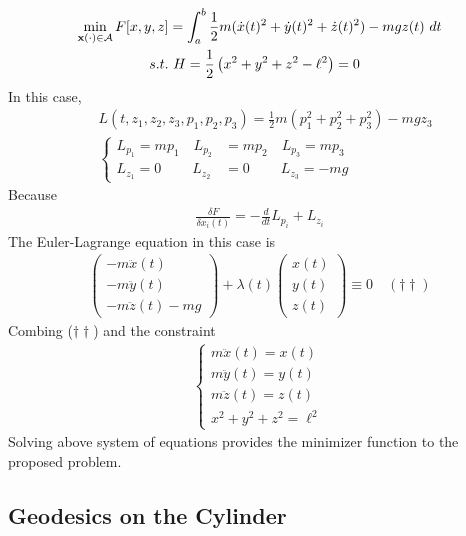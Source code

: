 \documentclass{article}
\begin{document}
	\begin{example}
		\begin{align}
			\min_{\textbf{x}(\cdot) \in \mathcal{{A}}} F[x, y, z] &= \int_a^b \frac{1}{2} m (\dot{x}(t)^2 + \dot{y}(t)^2 + \dot{z}(t)^2) - mgz(t)\ dt \\
			s.t.&\ H = \frac{1}{2} \left(x^2 + y^2 + z^2 - \ell^2 \right) = 0
		\end{align}
		In this case,
		\begin{align}
			&L(t, z_1, z_2, z_3, p_1, p_2, p_3) = \frac{1}{2} m (p_1^2 + p_2^2 + p_3^2) - mgz_3 \\
			&\begin{cases}
				L_{p_1} = mp_1 \quad
				L_{p_2} &= mp_2 \quad
				L_{p_3} = mp_3 \\
				L_{z_1} = 0 \quad \quad \ 
				L_{z_2} &= 0 \quad \quad \ 
				L_{z_3} = - mg
			\end{cases}
		\end{align}
		Because
		\begin{align}
			\frac{\delta F}{\delta x_i(t)} = - \frac{d}{dt} L_{p_i} + L_{z_i}
		\end{align}
		The Euler-Lagrange equation in this case is
		\begin{align}
			\begin{pmatrix}
				- m \ddot{x}(t) \\
				- m \ddot{y}(t) \\
				- m \ddot{z}(t) - mg
			\end{pmatrix}
			+ \lambda(t)
			\begin{pmatrix}
				x(t) \\
				y(t) \\
				z(t)
			\end{pmatrix} \equiv 0\quad (\dagger \dagger)
		\end{align}
		Combing ($\dagger \dagger$) and the constraint
		\begin{align}
			\begin{cases}
				m \ddot{x}(t) = x(t) \\
				m \ddot{y}(t) = y(t) \\
				m \ddot{z}(t) = z(t) \\
				x^2 + y^2 + z^2 = \ell^2
			\end{cases}
		\end{align}
		Solving above system of equations provides the minimizer function to the proposed problem.
	\end{example}
	
	\subsection{Geodesics on the Cylinder}
\end{document}
